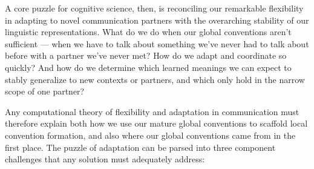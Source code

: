 \documentclass[11pt, floatsintext, jou]{apa6}
\begin{document}
A core puzzle for cognitive science, then, is reconciling our remarkable flexibility in adapting to novel communication partners with the overarching stability of our linguistic representations. What do we do when our global conventions aren't sufficient --- when we have to talk about something we've never had to talk about before with a partner we've never met? How do we adapt and coordinate so quickly? And how do we determine which learned meanings we can expect to stably generalize to new contexts or partners, and which only hold in the narrow scope of one partner?

Any computational theory of flexibility and adaptation in communication must therefore explain both how we use our mature global conventions to scaffold local convention formation, and also where our global conventions came from in the first place. The puzzle of adaptation can be parsed into three component challenges that any solution must adequately address:
\end{document}
